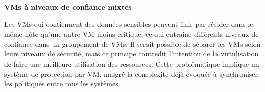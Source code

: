 

\textbf{VMs à niveaux de confiance mixtes}

Les VMs qui contiennent des données sensibles peuvent finir par résider dans le même hôte qu'une autre VM moins critique, ce qui entraine différents niveaux de confiance dans un groupement de VMs. Il serait possible de séparer les VMs selon leurs niveaux de sécurité, mais ce principe contredit l'intention de la virtulisation de faire une meilleure utilisation des ressources. Cette problématique implique un système de protection par VM, malgré la complexité déjà évoquée à synchroniser les politiques entre tous les systèmes.

